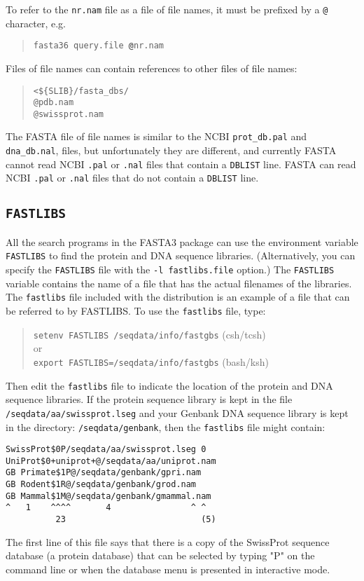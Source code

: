 \documentclass[11pt]{article}
\begin{document}
To refer to the \texttt{nr.nam} file as a file of file names, it must
be prefixed by a \texttt{@} character, e.g.
\begin{quote}
\texttt{fasta36 query.file \textbf{@}nr.nam}
\end{quote}
Files of file names can contain references to other files of file names:
\begin{quote}
\begin{verbatim}
<${SLIB}/fasta_dbs/
@pdb.nam
@swissprot.nam
\end{verbatim}
\end{quote}
The FASTA file of file names is similar to the NCBI
\texttt{prot\_db.pal} and \texttt{dna\_db.nal}, files, but
unfortunately they are different, and currently FASTA cannot read NCBI
\texttt{.pal} or \texttt{.nal} files that contain a \texttt{DBLIST}
line. FASTA can read NCBI \texttt{.pal} or \texttt{.nal} files that do
not contain a \texttt{DBLIST} line.

\subsection{\texttt{FASTLIBS}}
\label{fastlibs}

All the search programs in the FASTA3 package can use the environment
variable \texttt{FASTLIBS} to find the protein and DNA sequence
libraries. (Alternatively, you can specify the \texttt{FASTLIBS} file
with the \texttt{-l fastlibs.file} option.) The \texttt{FASTLIBS}
variable contains the name of a file that has the actual filenames of
the libraries.  The \texttt{fastlibs} file included with the
distribution is an example of a file that can be referred to by
FASTLIBS. To use the \texttt{fastlibs} file, type:
\begin{quote}
\texttt{setenv FASTLIBS /seqdata/info/fastgbs} (csh/tcsh)\\
 or\\
\texttt{export FASTLIBS=/seqdata/info/fastgbs} (bash/ksh)
\end{quote}
 Then edit the \texttt{fastlibs} file to indicate the location of the
 protein and DNA sequence libraries.  If the protein sequence library is
 kept in the file \texttt{/seqdata/aa/swissprot.lseg} and your Genbank
 DNA sequence library is kept in the directory:
 \texttt{/seqdata/genbank}, then the \texttt{fastlibs} file might
 contain:
\begin{verbatim}
SwissProt$0P/seqdata/aa/swissprot.lseg 0
UniProt$0+uniprot+@/seqdata/aa/uniprot.nam
GB Primate$1P@/seqdata/genbank/gpri.nam
GB Rodent$1R@/seqdata/genbank/grod.nam 
GB Mammal$1M@/seqdata/genbank/gmammal.nam
^   1    ^^^^       4                ^ ^
          23                           (5)
\end{verbatim}
The first line of this file says that there is a copy of the SwissProt
sequence database (a protein database) that can be selected by typing
"P" on the command line or when the database menu is presented in
interactive mode.
\end{document}

